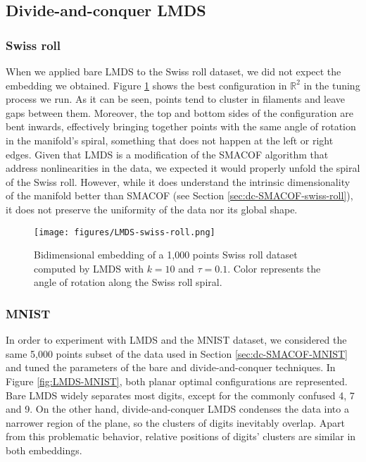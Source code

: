\subsection{Divide-and-conquer LMDS}
\label{sec:dc-LMDS}

\subsubsection{Swiss roll}

When we applied bare LMDS to the Swiss roll dataset, we did not expect the embedding we obtained. Figure \ref{fig:LMDS-swiss-roll} shows the best configuration in $\mathbb{R}^2$ in the tuning process we run. As it can be seen, points tend to cluster in filaments and leave gaps between them. Moreover, the top and bottom sides of the configuration are bent inwards, effectively bringing together points with the same angle of rotation in the manifold's spiral, something that does not happen at the left or right edges. Given that LMDS is a modification of the SMACOF algorithm that address nonlinearities in the data, we expected it would properly unfold the spiral of the Swiss roll. However, while it does understand the intrinsic dimensionality of the manifold better than SMACOF (see Section \ref{sec:dc-SMACOF-swiss-roll}), it does not preserve the uniformity of the data nor its global shape.

\begin{figure}
    \centering
    \texttt{[image: figures/LMDS-swiss-roll.png]}
    \caption{Bidimensional embedding of a 1,000 points Swiss roll dataset computed by LMDS with $k=10$ and $\tau = 0.1$. Color represents the angle of rotation along the Swiss roll spiral.}
    \label{fig:LMDS-swiss-roll}
\end{figure}

\subsubsection{MNIST}

In order to experiment with LMDS and the MNIST dataset, we considered the same 5,000 points subset of the data used in Section \ref{sec:dc-SMACOF-MNIST} and tuned the parameters of the bare and divide-and-conquer techniques. In Figure \ref{fig:LMDS-MNIST}, both planar optimal configurations are represented. Bare LMDS widely separates most digits, except for the commonly confused 4, 7 and 9. On the other hand, divide-and-conquer LMDS condenses the data into a narrower region of the plane, so the clusters of digits inevitably overlap. Apart from this problematic behavior, relative positions of digits' clusters are similar in both embeddings.

